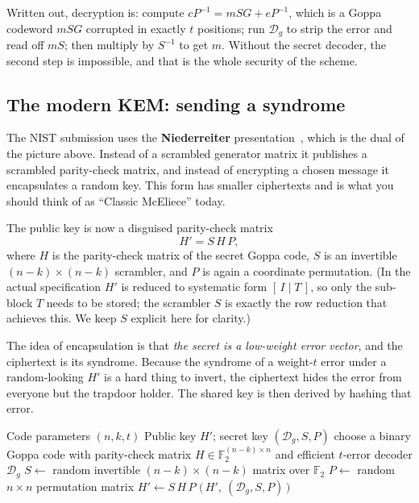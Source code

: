 Written out, decryption is: compute $cP^{-1} = mSG + eP^{-1}$, which is a Goppa codeword $mSG$ corrupted in exactly $t$ positions; run $\mathcal{D}_g$ to strip the error and read off $mS$; then multiply by $S^{-1}$ to get $m$. Without the secret decoder, the second step is impossible, and that is the whole security of the scheme.

\subsection{The modern KEM: sending a syndrome}

The NIST submission uses the \textbf{Niederreiter} presentation~\cite{niederreiter1986}, which is the dual of the picture above. Instead of a scrambled generator matrix it publishes a scrambled parity-check matrix, and instead of encrypting a chosen message it encapsulates a random key. This form has smaller ciphertexts and is what you should think of as ``Classic McEliece'' today.

The public key is now a disguised parity-check matrix
\[
H' = S\,H\,P ,
\]
where $H$ is the parity-check matrix of the secret Goppa code, $S$ is an invertible $(n-k)\times(n-k)$ scrambler, and $P$ is again a coordinate permutation. (In the actual specification $H'$ is reduced to systematic form $[\,I \mid T\,]$, so only the sub-block $T$ needs to be stored; the scrambler $S$ is exactly the row reduction that achieves this. We keep $S$ explicit here for clarity.)

The idea of encapsulation is that \emph{the secret is a low-weight error vector}, and the ciphertext is its syndrome. Because the syndrome of a weight-$t$ error under a random-looking $H'$ is a hard thing to invert, the ciphertext hides the error from everyone but the trapdoor holder. The shared key is then derived by hashing that error.

\begin{algorithm}[H]
\caption{Classic McEliece KeyGen (teaching form)}
\label{alg:mce-keygen}
\begin{algorithmic}[1]
\Require Code parameters $(n,k,t)$
\Ensure Public key $H'$; secret key $(\mathcal{D}_g, S, P)$
\State choose a binary Goppa code with parity-check matrix $H \in \mathbb{F}_2^{(n-k)\times n}$
\Statex \hspace{1.4em}and efficient $t$-error decoder $\mathcal{D}_g$ 
\State $S \gets$ random invertible $(n-k)\times(n-k)$ matrix over $\mathbb{F}_2$ 
\State $P \gets$ random $n\times n$ permutation matrix 
\State $H' \gets S\,H\,P$ 
\State \Return $\big(\,H',\ (\mathcal{D}_g, S, P)\,\big)$
\end{algorithmic}
\end{algorithm}

